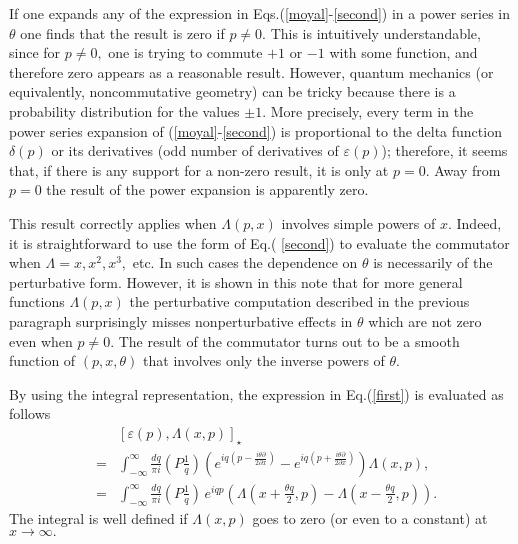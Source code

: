 \documentclass[a4paper,12pt]{article}
\begin{document}
If one expands any of the expression in Eqs.(\ref{moyal}-\ref{second}) in a
power series in $\theta $ one finds that the result is zero if $p\neq 0.$
This is intuitively understandable, since for $p\neq 0,$ one is trying to
commute $+1$ or $-1$ with some function, and therefore zero appears as a
reasonable result. However, quantum mechanics (or equivalently,
noncommutative geometry) can be tricky because there is a probability
distribution for the values $\pm 1.$ More precisely, every term in the power
series expansion of (\ref{moyal}-\ref{second}) is proportional to the delta
function $\delta \left( p\right) $ or its derivatives (odd number of
derivatives of $\varepsilon \left( p\right) $); therefore, it seems that, if
there is any support for a non-zero result, it is only at $p=0.$ Away from $%
p=0$ the result of the power expansion is apparently zero.

This result correctly applies when $\Lambda \left( p,x\right) $ involves
simple powers of $x.$ Indeed, it is straightforward to use the form of Eq.(%
\ref{second}) to evaluate the commutator when $\Lambda =x,x^{2},x^{3},$ etc.
In such cases the dependence on $\theta $ is necessarily of the perturbative
form. However, it is shown in this note that for more general functions $%
\Lambda \left( p,x\right) $ the perturbative computation described in the
previous paragraph surprisingly misses nonperturbative effects in $\theta $
which are not zero even when $p\neq 0.$ The result of the commutator turns
out to be a smooth function of $\left( p,x,\theta \right) $ that involves
only the inverse powers of $\theta .$

By using the integral representation, the expression in Eq.(\ref{first}) is
evaluated as follows
\begin{eqnarray}
&&\left[ \varepsilon \left( p\right) ,\Lambda \left( x,p\right) \right]
_{\star } \\
&=&\int_{-\infty }^{\infty }\frac{dq}{\pi i}\left( P\frac{1}{q}\right)
\left( e^{iq\left( p-\frac{i\theta \partial }{2\partial x}\right)
}-e^{iq\left( p+\frac{i\theta \partial }{2\partial x}\right) }\right)
\Lambda \left( x,p\right) , \\
&=&\int_{-\infty }^{\infty }\frac{dq}{\pi i}\left( P\frac{1}{q}\right)
\,e^{iqp}\left( \Lambda \left( x+\frac{\theta q}{2},p\right) -\Lambda \left(
x-\frac{\theta q}{2},p\right) \right) .
\end{eqnarray}
The integral is well defined if $\Lambda \left( x,p\right) $ goes to zero
(or even to a constant) at $x\rightarrow \infty .$
\end{document}
